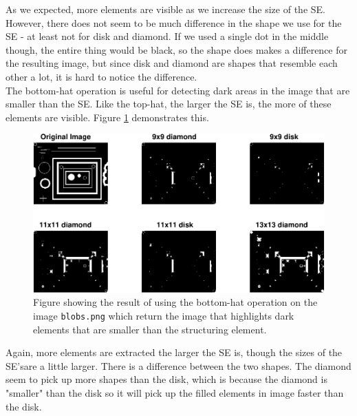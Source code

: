 \documentclass[a4paper]{article}
\begin{document}
As we expected, more elements are visible as we increase the size of the SE. However, there does not seem to be much difference in the shape we use for the SE - at least not for disk and diamond. If we used a single dot in the middle though, the entire thing would be black, so the shape does makes a difference for the resulting image, but since disk and diamond are shapes that resemble each other a lot, it is hard to notice the difference. \\
The bottom-hat operation is useful for detecting dark areas in the image that are smaller than the SE. Like the top-hat, the larger the SE is, the more of these elements are visible. Figure \ref{3c} demonstrates this.
\begin{figure}[H]
  \centering
  \captionsetup{justification=centering}
  \includegraphics[width=\textwidth]{q3c-crop.pdf}
  \caption{Figure showing the result of using the bottom-hat operation on the image \texttt{blobs.png} which return the image that highlights dark elements that are smaller than the structuring element.}
  \label{3c}
\end{figure}
Again, more elements are extracted the larger the SE is, though the sizes of the SE'sare a little larger. There is a difference between the two shapes. The diamond seem to pick up more shapes than the disk, which is because the diamond is "smaller" than the disk so it will pick up the filled elements in image faster than the disk.
\end{document}
